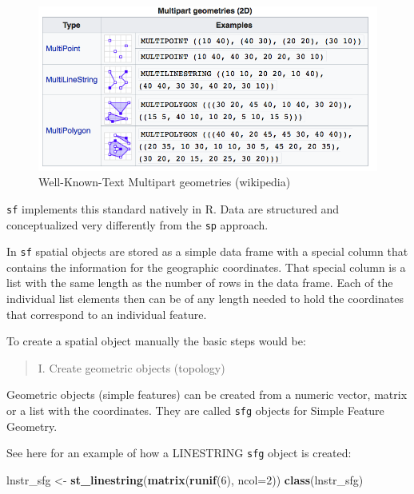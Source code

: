 \documentclass[]{book}
\newenvironment{Shaded}{\begin{snugshade}}{\end{snugshade}}
\newcommand{\KeywordTok}[1]{\textcolor[rgb]{0.13,0.29,0.53}{\textbf{#1}}}
\newcommand{\DataTypeTok}[1]{\textcolor[rgb]{0.13,0.29,0.53}{#1}}
\newcommand{\DecValTok}[1]{\textcolor[rgb]{0.00,0.00,0.81}{#1}}
\newcommand{\StringTok}[1]{\textcolor[rgb]{0.31,0.60,0.02}{#1}}
\newcommand{\NormalTok}[1]{#1}
\theoremstyle{definition}
\theoremstyle{definition}
\theoremstyle{definition}
\theoremstyle{remark}
\begin{document}
\begin{figure}
\includegraphics[width=1\linewidth]{img/wkt_multipart} \caption{Well-Known-Text Multipart geometries (wikipedia)}\label{fig:wkt-multipart}
\end{figure}

\texttt{sf} implements this standard natively in R. Data are structured
and conceptualized very differently from the \texttt{sp} approach.

In \texttt{sf} spatial objects are stored as a simple data frame with a
special column that contains the information for the geographic
coordinates. That special column is a list with the same length as the
number of rows in the data frame. Each of the individual list elements
then can be of any length needed to hold the coordinates that correspond
to an individual feature.

To create a spatial object manually the basic steps would be:

\begin{quote}
I. Create geometric objects (topology)
\end{quote}

Geometric objects (simple features) can be created from a numeric
vector, matrix or a list with the coordinates. They are called
\texttt{sfg} objects for Simple Feature Geometry.

See here for an example of how a LINESTRING \texttt{sfg} object is
created:

\begin{Shaded}
\begin{Highlighting}[]
\NormalTok{lnstr_sfg <-}\StringTok{ }\KeywordTok{st_linestring}\NormalTok{(}\KeywordTok{matrix}\NormalTok{(}\KeywordTok{runif}\NormalTok{(}\DecValTok{6}\NormalTok{), }\DataTypeTok{ncol=}\DecValTok{2}\NormalTok{)) }
\KeywordTok{class}\NormalTok{(lnstr_sfg)}
\end{Highlighting}
\end{Shaded}
\end{document}
